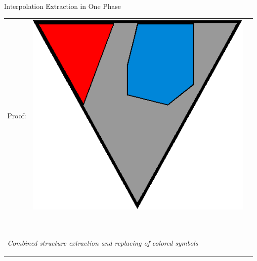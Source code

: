 \documentclass[final,compress]{beamer}
\begin{document}
\newcommand{\onePhaseArrowLabel}{Combined structure extraction and replacing of colored symbols}

\subsection{}
\begin{frame}{Interpolation Extraction in One Phase}
	\small
	\begin{tabular}{p{}ll}

		Proof: 
		&

		\multicolumn{1}{m{\fakemulticolwidth}}{
			\includegraphics[width=\proofwidth]{figures/two_phase_draft_proof}
		}
		&
		\vspace*{0.2em}
		\\

		\multicolumn{2}{l}{
			\proofindent{\stagearrow} ~\parbox[c]{15em}{\raggedright\emph{ \onePhaseArrowLabel } }
			\vspace*{0.2em}
		}
		\\


\end{tabular}
\end{frame}
\end{document}

